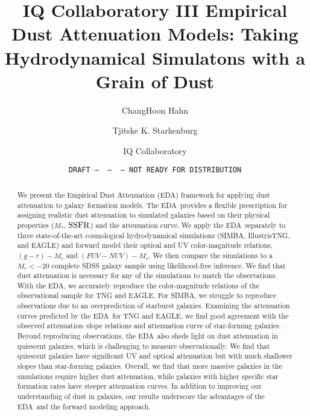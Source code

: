 \documentclass[12pt, letterpaper, preprint, comicneue]{aastex63}
\newcommand{\gr}{g{-}r}
\newcommand{\fnuv}{FUV{-}NUV}
\newcommand{\ssfr}{{\rm SSFR}}
\newcommand{\eda}{EDA}
\newcommand{\ch}[1]{{\color{orange}#1}}
\begin{document}
 \sloppy\sloppypar\frenchspacing 

\title{IQ Collaboratory III Empirical Dust Attenuation Models: Taking Hydrodynamical Simulatons with a Grain of Dust}
\date{\texttt{DRAFT~---~\githash~---~\gitdate~---~NOT READY FOR DISTRIBUTION}}

\author{ChangHoon Hahn}

\author{Tjitske K. Starkenburg}

\author{IQ Collaboratory}

\begin{abstract}
    We present the Empirical Dust Attenuation (\eda) framework for applying
    dust attenuation to galaxy formation models.
    \ch{
        The \eda~provides a flexible prescription for assigning realistic dust
        attenuation to simulated galaxies based on their physical properties
        ($M_*$, $\ssfr$) and the \cite{noll2009} attenuation curve. 
    }
    We apply the \eda~separately to three state-of-the-art cosmological
    hydrodynamical simulations (SIMBA, IllustrisTNG, and EAGLE) and forward
    model their optical and UV
    color-magnitude relations, $(\gr) - M_r$ and $(\fnuv)-M_r$. 
    We then compare the simulations to a $M_r < -20$ complete SDSS galaxy sample
    using likelihood-free inference. 
    \ch{
        We find that dust attenuation is necessary for any of the simulations
        to match the observations. 
    }
    With the \eda, we accurately reproduce the color-magnitude relations of the
    observational sample for TNG and EAGLE. 
    For SIMBA, we struggle to reproduce observations due to an overprediction
    of starburst galaxies. 
    \ch{ 
        Examining the attenuation curves predicted by the \eda~for TNG and
        EAGLE, we find good agreement with the observed attenuation--slope
        relations and attenuation curve of star-forming galaxies.
    }
    Beyond reproducing observations,
    the \eda~also sheds light on dust attenuation in quiescent galaxies, which
    is challenging to measure observationally. We find that quiescent galaxies 
    have significant UV and optical attenuation but with much shallower
    slopes than star-forming galaxies. 
    \ch{ 
        Overall, we find that more massive galaxies in the simulations require
        higher dust attenuation, 
    }
    while galaxies with higher specific star formation rates have steeper 
    attenuation curves.
    In addition to improving our understanding of dust in galaxies, our results
    underscore the advantages of the \eda~and the forward modeling approach. 
\end{abstract}
\end{document}
